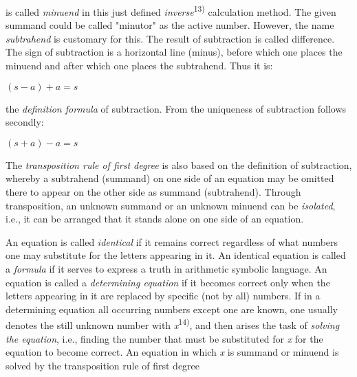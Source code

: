 \thispagestyle{fancy}

\vspace{0.5cm}

is called \textit{minuend} in this just defined \textit{inverse}\textsuperscript{13)} calculation method. The given summand could be called "minutor" as the active number. However, the name \textit{subtrahend} is customary for this. The result of subtraction is called difference. The sign of subtraction is a horizontal line (minus), before which one places the minuend and after which one places the subtrahend. Thus it is:

\begin{center}
$(s - a) + a = s$
\end{center}

the \textit{definition formula} of subtraction. From the uniqueness of subtraction follows secondly:

\begin{center}
$(s + a) - a = s$
\end{center}

The \textit{transposition rule of first degree} is also based on the definition of subtraction, whereby a subtrahend (summand) on one side of an equation may be omitted there to appear on the other side as summand (subtrahend). Through transposition, an unknown summand or an unknown minuend can be \textit{isolated}, i.e., it can be arranged that it stands alone on one side of an equation.

An equation is called \textit{identical} if it remains correct regardless of what numbers one may substitute for the letters appearing in it. An identical equation is called a \textit{formula} if it serves to express a truth in arithmetic symbolic language. An equation is called a \textit{determining equation} if it becomes correct only when the letters appearing in it are replaced by specific (not by all) numbers. If in a determining equation all occurring numbers except one are known, one usually denotes the still unknown number with \textit{x}\textsuperscript{14)}, and then arises the task of \textit{solving the equation}, i.e., finding the number that must be substituted for \textit{x} for the equation to become correct. An equation in which \textit{x} is summand or minuend \hfill is \hfill solved \hfill by \hfill the \hfill transposition \hfill rule \hfill of \hfill first \hfill degree \hfill

